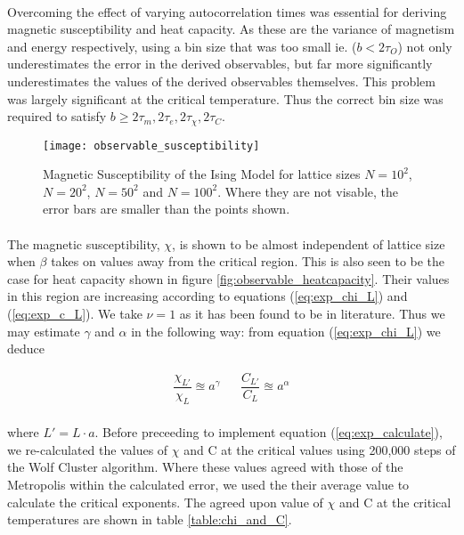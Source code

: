 \documentclass[12pt] {report} %
\begin{document}
			\paragraph{}
				Overcoming the effect of varying autocorrelation times was essential for deriving magnetic susceptibility and heat capacity. As these are the variance of magnetism and energy respectively, using a bin size that was too small ie. ($b < 2\tau_O$) not only underestimates the error in the derived observables, but far more significantly underestimates the values of the derived observables themselves. This problem was largely significant at the critical temperature. Thus the correct bin size was required to satisfy $b \ge 2\tau_m, 2\tau_e, 2\tau_\chi, 2\tau_C$.
				
			\begin{figure}[H]
				\centering
				\texttt{[image: observable\_susceptibility]}
				\caption{Magnetic Susceptibility of the Ising Model for lattice sizes $N = 10^2$, $N = 20^2$, $N = 50^2$ and $N = 100^2$. Where they are not visable, the error bars are smaller than the points shown.}
				\label{fig:observable_susceptibility}
			\end{figure}
			
			\paragraph{}
				The magnetic susceptibility, $\chi$, is shown to be almost independent of lattice size when $\beta$ takes on values away from the critical region. This is also seen to be the case for heat capacity shown in figure \ref{fig:observable_heatcapacity}. Their values in this region are increasing according to equations (\ref{eq:exp_chi_L}) and (\ref{eq:exp_c_L}).  We take $\nu = 1$ as it has been found to be in literature. Thus we may estimate $\gamma$  and $\alpha$ in the following way: from equation (\ref{eq:exp_chi_L}) we deduce
				
			\begin{align}
				\dfrac{\chi_{L'}}{\chi_{L}} \approxeq a^\gamma &&  \dfrac{C_{L'}}{C_{L}} \approxeq a^\alpha \label{eq:exp_calculate}
			\end{align}
			
			\paragraph{}
				where $L' = L\cdot a$. Before preceeding to implement equation (\ref{eq:exp_calculate}), we re-calculated the values of $\chi$ and C at the critical values using 200,000 steps of the Wolf Cluster algorithm. Where these values agreed with those of the Metropolis within the calculated error, we used the their average value to calculate the critical exponents. The agreed upon value of $\chi$ and C at the critical temperatures are shown in table \ref{table:chi_and_C}.
				
\end{document}
